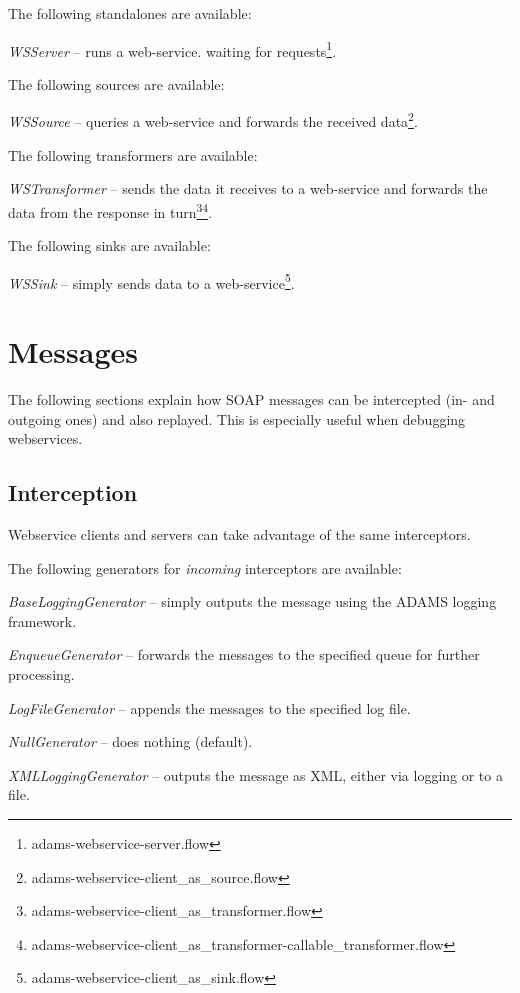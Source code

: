 \documentclass[a4paper]{book}
\begin{document}
\begin{tight_itemize}
\begin{tight_itemize}
The following standalones are available:
\begin{tight_itemize}
	\item \textit{WSServer} -- runs a web-service. waiting for 
	requests\footnote{adams-webservice-server.flow}.
\end{tight_itemize}
The following sources are available:
\begin{tight_itemize}
	\item \textit{WSSource} -- queries a web-service and forwards the received 
	data\footnote{adams-webservice-client\_as\_source.flow}.
\end{tight_itemize}
The following transformers are available:
\begin{tight_itemize}
	\item \textit{WSTransformer} -- sends the data it receives to a web-service
	and forwards the data from the response in 
	turn\footnote{adams-webservice-client\_as\_transformer.flow}\footnote{adams-webservice-client\_as\_transformer-callable\_transformer.flow}.
\end{tight_itemize}
The following sinks are available:
\begin{tight_itemize}
	\item \textit{WSSink} -- simply sends data to a web-service\footnote{adams-webservice-client\_as\_sink.flow}.
\end{tight_itemize}

\chapter{Messages}
The following sections explain how SOAP messages can be intercepted (in- and
outgoing ones) and also replayed. This is especially useful when debugging
webservices.

\section{Interception}
Webservice clients and servers can take advantage of the same interceptors.

\noindent The following generators for \textit{incoming} interceptors are available:
\begin{tight_itemize}
  \item \textit{BaseLoggingGenerator} -- simply outputs the message using the
  ADAMS logging framework.
  \item \textit{EnqueueGenerator} -- forwards the messages to the specified
  queue for further processing.
  \item \textit{LogFileGenerator} -- appends the messages to the specified log file.
  \item \textit{NullGenerator} -- does nothing (default).
  \item \textit{XMLLoggingGenerator} -- outputs the message as XML, either via
  logging or to a file.
\end{tight_itemize}


\end{tight_itemize}
\end{tight_itemize}
\end{document}
